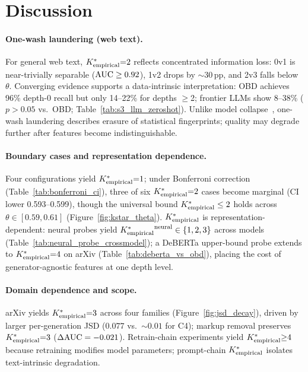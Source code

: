 \section{Discussion}
\label{sec:discussion}
\label{sec:why_kstar}
\label{sec:one_wash}
\label{sec:negative_graduated}
\label{sec:repr_dependence}
\label{sec:boundary_cases}
\label{sec:length_confound}

\paragraph{One-wash laundering (web text).}
For general web text, ${K^*_{\text{empirical}}}{=}2$ reflects concentrated information loss: 0v1 is near-trivially separable ($\text{AUC} \geq 0.92$), 1v2 drops by ${\sim}$30\,pp, and 2v3 falls below $\theta$.
Converging evidence supports a data-intrinsic interpretation: OBD achieves 96\% depth-0 recall but only 14--22\% for depths $\geq$2; frontier LLMs show 8--38\% ($p > 0.05$ vs.\ OBD; Table~\ref{tab:s3_llm_zeroshot}).
Unlike model collapse~\cite{shumailov2024collapse}, one-wash laundering describes erasure of statistical fingerprints; quality may degrade further after features become indistinguishable.

\paragraph{Boundary cases and representation dependence.}
Four configurations yield ${K^*_{\text{empirical}}}{=}1$; under Bonferroni correction (Table~\ref{tab:bonferroni_ci}), three of six ${K^*_{\text{empirical}}}{=}2$ cases become marginal (CI lower 0.593--0.599), though the universal bound ${K^*_{\text{empirical}}} \leq 2$ holds across $\theta \in [0.59, 0.61]$ (Figure~\ref{fig:kstar_theta}).
${K^*_{\text{empirical}}}$ is representation-dependent: neural probes yield ${K^*_{\text{empirical}}}^{\text{neural}} \in \{1,2,3\}$ across models (Table~\ref{tab:neural_probe_crossmodel}); a DeBERTa upper-bound probe extends to ${K^*_{\text{empirical}}}{=}4$ on arXiv (Table~\ref{tab:deberta_vs_obd}), placing the cost of generator-agnostic features at one depth level.

\paragraph{Domain dependence and scope.}
arXiv yields ${K^*_{\text{empirical}}}{=}3$ across four families (Figure~\ref{fig:jsd_decay}), driven by larger per-generation JSD ($0.077$ vs.\ ${\sim}0.01$ for C4); markup removal preserves ${K^*_{\text{empirical}}}{=}3$ ($\Delta\text{AUC} = {-}0.021$).
Retrain-chain experiments yield ${K^*_{\text{empirical}}}{\geq}4$ because retraining modifies model parameters; prompt-chain ${K^*_{\text{empirical}}}$ isolates text-intrinsic degradation.

